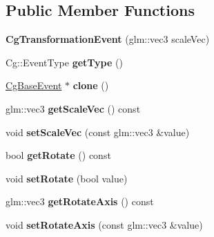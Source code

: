 \subsection*{Public Member Functions}
\begin{DoxyCompactItemize}
\item 
\mbox{\label{class_cg_transformation_event_a338a83dd4fcf78860c57172d62108c3b}} 
{\bfseries Cg\+Transformation\+Event} (glm\+::vec3 scale\+Vec)
\item 
\mbox{\label{class_cg_transformation_event_a5f5b3fe65191a9b958542c580a4b6098}} 
Cg\+::\+Event\+Type {\bfseries get\+Type} ()
\item 
\mbox{\label{class_cg_transformation_event_a8a592743cafa4d2c49365ad90b7c6359}} 
\hyperlink{class_cg_base_event}{Cg\+Base\+Event} $\ast$ {\bfseries clone} ()
\item 
\mbox{\label{class_cg_transformation_event_a22f79865aecbf9bafa841d22bef21482}} 
glm\+::vec3 {\bfseries get\+Scale\+Vec} () const
\item 
\mbox{\label{class_cg_transformation_event_a38620596aa3259555c4dca809d2a3aa0}} 
void {\bfseries set\+Scale\+Vec} (const glm\+::vec3 \&value)
\item 
\mbox{\label{class_cg_transformation_event_a46d46c60d87fcbb51b39b558c68e18b8}} 
bool {\bfseries get\+Rotate} () const
\item 
\mbox{\label{class_cg_transformation_event_a8055cabc048d3f2caca8aae7b2b0c0d8}} 
void {\bfseries set\+Rotate} (bool value)
\item 
\mbox{\label{class_cg_transformation_event_a4adefc20c96393b9ddd9ebcce3646719}} 
glm\+::vec3 {\bfseries get\+Rotate\+Axis} () const
\item 
\mbox{\label{class_cg_transformation_event_ad85924f5f8b155fe15c69880545ff83c}} 
void {\bfseries set\+Rotate\+Axis} (const glm\+::vec3 \&value)
\end{DoxyCompactItemize}


